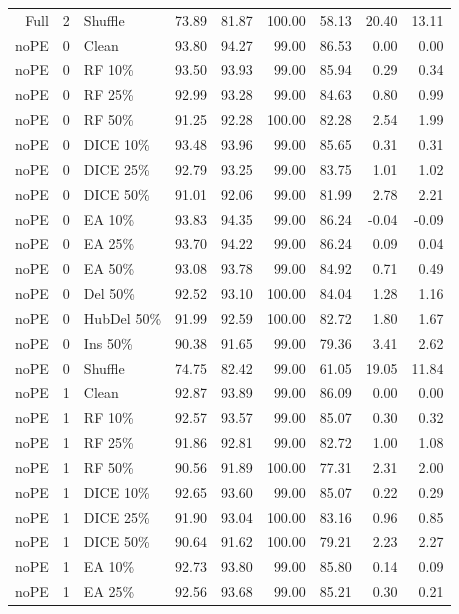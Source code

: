 {\begin{longtable}{rllrrrrrr}
Full & 2 & Shuffle & 73.89 & 81.87 & 100.00 & 58.13 & 20.40 & 13.11 \\
noPE & 0 & Clean & 93.80 & 94.27 & 99.00 & 86.53 & 0.00 & 0.00 \\
noPE & 0 & RF 10\% & 93.50 & 93.93 & 99.00 & 85.94 & 0.29 & 0.34 \\
noPE & 0 & RF 25\% & 92.99 & 93.28 & 99.00 & 84.63 & 0.80 & 0.99 \\
noPE & 0 & RF 50\% & 91.25 & 92.28 & 100.00 & 82.28 & 2.54 & 1.99 \\
noPE & 0 & DICE 10\% & 93.48 & 93.96 & 99.00 & 85.65 & 0.31 & 0.31 \\
noPE & 0 & DICE 25\% & 92.79 & 93.25 & 99.00 & 83.75 & 1.01 & 1.02 \\
noPE & 0 & DICE 50\% & 91.01 & 92.06 & 99.00 & 81.99 & 2.78 & 2.21 \\
noPE & 0 & EA 10\% & 93.83 & 94.35 & 99.00 & 86.24 & -0.04 & -0.09 \\
noPE & 0 & EA 25\% & 93.70 & 94.22 & 99.00 & 86.24 & 0.09 & 0.04 \\
noPE & 0 & EA 50\% & 93.08 & 93.78 & 99.00 & 84.92 & 0.71 & 0.49 \\
noPE & 0 & Del 50\% & 92.52 & 93.10 & 100.00 & 84.04 & 1.28 & 1.16 \\
noPE & 0 & HubDel 50\% & 91.99 & 92.59 & 100.00 & 82.72 & 1.80 & 1.67 \\
noPE & 0 & Ins 50\% & 90.38 & 91.65 & 99.00 & 79.36 & 3.41 & 2.62 \\
noPE & 0 & Shuffle & 74.75 & 82.42 & 99.00 & 61.05 & 19.05 & 11.84 \\
noPE & 1 & Clean & 92.87 & 93.89 & 99.00 & 86.09 & 0.00 & 0.00 \\
noPE & 1 & RF 10\% & 92.57 & 93.57 & 99.00 & 85.07 & 0.30 & 0.32 \\
noPE & 1 & RF 25\% & 91.86 & 92.81 & 99.00 & 82.72 & 1.00 & 1.08 \\
noPE & 1 & RF 50\% & 90.56 & 91.89 & 100.00 & 77.31 & 2.31 & 2.00 \\
noPE & 1 & DICE 10\% & 92.65 & 93.60 & 99.00 & 85.07 & 0.22 & 0.29 \\
noPE & 1 & DICE 25\% & 91.90 & 93.04 & 100.00 & 83.16 & 0.96 & 0.85 \\
noPE & 1 & DICE 50\% & 90.64 & 91.62 & 100.00 & 79.21 & 2.23 & 2.27 \\
noPE & 1 & EA 10\% & 92.73 & 93.80 & 99.00 & 85.80 & 0.14 & 0.09 \\
noPE & 1 & EA 25\% & 92.56 & 93.68 & 99.00 & 85.21 & 0.30 & 0.21 \\

\end{longtable}}
